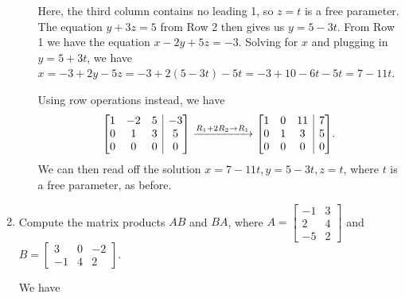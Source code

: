 \documentclass[12pt]{article}
\makeatletter
\newcommand{\points}[1]{\marginpar{\hspace{24pt}[#1]}}
\newenvironment{amatrix}[1]{%
  \left[\begin{array}{@{}*{#1}{c}|c@{}}
}{%
  \end{array}\right]
}
\makeatother
\begin{document}
\begin{enumerate}
\begin{enumerate}
\bigskip

Here, the third column contains no leading 1, so $z=t$ is a free parameter. The equation $y+3z=5$ from  Row 2 then gives us $y=5-3t$. From Row 1 we have the equation $x-2y+5z=-3$. Solving for $x$ and plugging in $y=5+3t$, we have $x=-3+2y-5z=-3+2(5-3t)-5t = -3+10-6t-5t = 7-11t$. 

\medskip

Using row operations instead, we have
\[
 \begin{amatrix}{3}1&-2&5&-3\\0&1&3&5\\0&0&0&0\end{amatrix}\xrightarrow{\scriptsize{R_1+2R_2\to R_1}}\begin{amatrix}{3}1&0&11&7\\0&1&3&5\\0&0&0&0\end{amatrix}.
\]
We can then read off the solution $x=7-11t, y=5-3t, z=t$, where $t$ is a free parameter, as before.

\end{enumerate}
 \newpage

\item Compute the matrix products $AB$ and $BA$, where $A = \begin{bmatrix}-1&3\\2&4\\-5&2\end{bmatrix}$ and $B = \begin{bmatrix}3&0&-2\\-1&4&2\end{bmatrix}$.\points{8}

\bigskip

We have


\end{enumerate}
\end{document}
